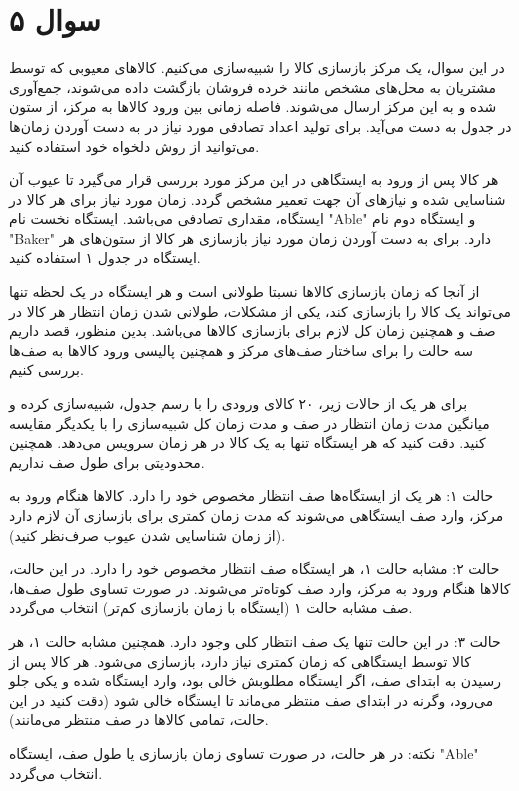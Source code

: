 \section*{سوال ۵}

در این سوال، یک مرکز بازسازی کالا را شبیه‌سازی می‌کنیم. کالاهای معیوبی که توسط مشتریان به محل‌های مشخص مانند خرده فروشان بازگشت داده می‌شوند، جمع‌آوری شده و به این مرکز ارسال می‌شوند. فاصله زمانی بین ورود کالاها به مرکز، از ستون 
در جدول به دست می‌آید. برای تولید اعداد تصادفی مورد نیاز در به دست آوردن زمان‌ها می‌توانید از روش دلخواه خود استفاده کنید.

هر کالا پس از ورود به ایستگاهی در این مرکز مورد بررسی قرار می‌گیرد تا عیوب آن شناسایی شده و نیازهای آن جهت تعمیر مشخص گردد. زمان مورد نیاز برای هر کالا در ایستگاه، مقداری تصادفی می‌باشد. ایستگاه نخست نام "Able" و ایستگاه دوم نام "Baker" دارد. برای به دست آوردن زمان مورد نیاز بازسازی هر کالا از ستون‌های هر ایستگاه در جدول ۱ استفاده کنید.

از آنجا که زمان بازسازی کالاها نسبتا طولانی است و هر ایستگاه در یک لحظه تنها می‌تواند یک کالا را بازسازی کند، یکی از مشکلات، طولانی شدن زمان انتظار هر کالا در صف و همچنین زمان کل لازم برای بازسازی کالاها می‌باشد. بدین منظور، قصد داریم سه حالت را برای ساختار صف‌های مرکز و همچنین پالیسی ورود کالاها به صف‌ها بررسی کنیم.

برای هر یک از حالات زیر، ۲۰ کالای ورودی را با رسم جدول، شبیه‌سازی کرده و میانگین مدت زمان انتظار در صف و مدت زمان کل شبیه‌سازی را با یکدیگر مقایسه کنید. دقت کنید که هر ایستگاه تنها به یک کالا در هر زمان سرویس می‌دهد. همچنین محدودیتی برای طول صف نداریم.

حالت ۱: هر یک از ایستگاه‌ها صف انتظار مخصوص خود را دارد. کالاها هنگام ورود به مرکز، وارد صف ایستگاهی می‌شوند که مدت زمان کمتری برای بازسازی آن لازم دارد (از زمان شناسایی شدن عیوب صرف‌نظر کنید).

حالت ۲: مشابه حالت ۱، هر ایستگاه صف انتظار مخصوص خود را دارد. در این حالت، کالاها هنگام ورود به مرکز، وارد صف کوتاه‌تر می‌شوند. در صورت تساوی طول صف‌ها، صف مشابه حالت ۱ (ایستگاه با زمان بازسازی کم‌تر) انتخاب می‌گردد.

حالت ۳: در این حالت تنها یک صف انتظار کلی وجود دارد. همچنین مشابه حالت ۱، هر کالا توسط ایستگاهی که زمان کمتری نیاز دارد، بازسازی می‌شود. هر کالا پس از رسیدن به ابتدای صف، اگر ایستگاه مطلوبش خالی بود، وارد ایستگاه شده و یکی جلو می‌رود، وگرنه در ابتدای صف منتظر می‌ماند تا ایستگاه خالی شود (دقت کنید در این حالت، تمامی کالاها در صف منتظر می‌مانند).

نکته: در هر حالت، در صورت تساوی زمان بازسازی یا طول صف، ایستگاه "Able" انتخاب می‌گردد.

